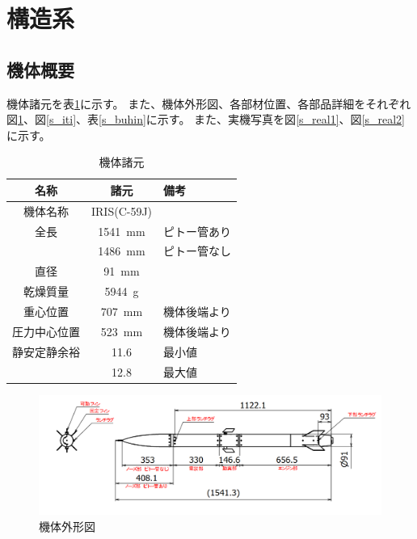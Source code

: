 \documentclass[a4paper,11pt,titlepage,uplatex]{jsarticle}
\begin{document}
\newpage
\section{構造系}

\subsection{機体概要}
機体諸元を表\ref{s_59syogen}に示す。
また、機体外形図、各部材位置、各部品詳細をそれぞれ図\ref{s_gaikei}、図\ref{s_iti}、表\ref{s_buhin}に示す。
また、実機写真を図\ref{s_real1}、図\ref{s_real2}に示す。

\begin{table}[H]
    \centering
    \caption{機体諸元}
    \begin{tabular}{ccl} \toprule
        名称     & 諸元            & 備考     \\\midrule
        機体名称   & IRIS(C-59J)            \\
        全長     & \SI{1541}{mm} & ピトー管あり \\
               & \SI{1486}{mm} & ピトー管なし \\
        直径     & \SI{91}{mm}            \\
        乾燥質量   & \SI{5944}{g}           \\
        重心位置   & \SI{707}{mm}  & 機体後端より \\
        圧力中心位置 & \SI{523}{mm}  & 機体後端より \\
        静安定静余裕 & 11.6          & 最小値    \\
               & 12.8          & 最大値    \\
        \bottomrule
    \end{tabular}
    \label{s_59syogen}
\end{table}

\begin{figure}[H]
    \centering
    \includegraphics[scale = 0.6]{pic_str/s_sunpou.png}
    \caption{機体外形図}
    \label{s_gaikei}
\end{figure}
\end{document}
